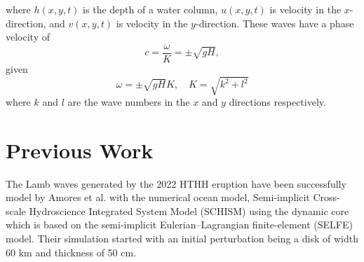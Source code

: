 \documentclass[twoside]{bsu-ms}
\begin{document}
where $h(x,y,t)$ is the depth of a water column, $u(x,y,t)$ is velocity in the $x$-direction, and $v(x,y,t)$ is velocity in the $y$-direction. These waves have a phase velocity of
\begin{equation}\label{eq:1.20}
	c=\frac{\omega}{K}=\pm\sqrt{gH},
\end{equation}
given
\begin{equation}\label{eq:1.21}
\omega = \pm\sqrt{gH}K,\quad K = \sqrt{k^{2}+l^{2}}
\end{equation}
where $k$ and $l$ are the wave numbers in the $x$ and $y$ directions respectively.
\section{Previous Work}\label{sec:1.2}
The Lamb waves generated by the 2022 HTHH eruption have been successfully model by Amores et al. \cite{amores2022numerical} with the numerical ocean model, Semi-implicit Cross-scale Hydroscience Integrated System Model (SCHISM)\cite{zhang2016seamless} using the dynamic core which is based on the semi-implicit Eulerian–Lagrangian finite-element (SELFE) model\cite{zhang2008selfe}. Their simulation started with an initial perturbation being a disk of width 60 $\mathrm{km}$ and thickness of 50 $\mathrm{cm}$.
\end{document}
